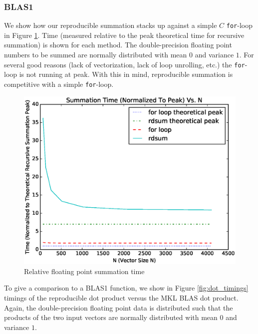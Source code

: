   \subsubsection{BLAS1}

    We show how our reproducible summation stacks up against a simple $C$ \texttt{for}-loop in Figure \ref{fig:forloop_timings}. Time (measured relative to the peak theoretical time for recursive summation) is shown for each method. The double-precision floating point numbers to be summed are normally distributed with mean $0$ and variance $1$. For several good reasons (lack of vectorization, lack of loop unrolling, etc.) the \texttt{for}-loop is not running at peak. With this in mind, reproducible summation is competitive with a simple \texttt{for}-loop.
  \begin{figure}[H]
  \begin{center}
  \includegraphics[width=\textwidth]{plots/sum_comparison}
  \caption{Relative floating point summation time}
  \label{fig:forloop_timings}
  \end{center}
  \end{figure}
    To give a comparison to a BLAS1 function, we show in Figure \ref{fig:dot_timings} timings of the reproducible dot product versus the MKL BLAS dot product. Again, the double-precision floating point data is distributed such that the products of the two input vectors are normally distributed with mean $0$ and variance $1$.
